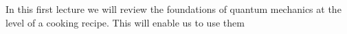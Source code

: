 In this first lecture we will review the foundations of quantum mechanics at the level of a cooking recipe. This will enable us to use them 